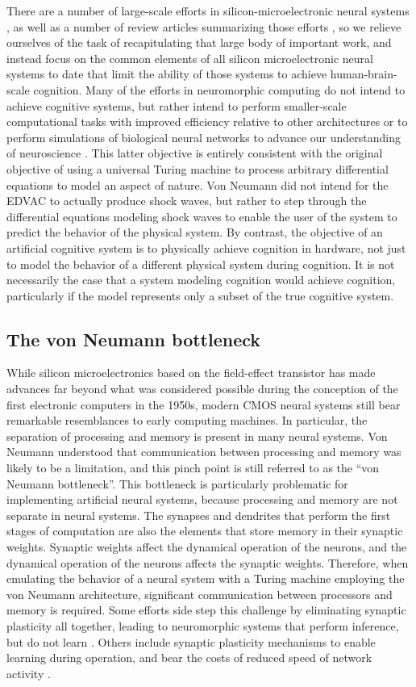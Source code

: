\documentclass[twocolumn]{article}
\begin{document}
There are a number of large-scale efforts in silicon-microelectronic neural systems \cite{}, as well as a number of review articles summarizing those efforts \cite{}, so we relieve ourselves of the task of recapitulating that large body of important work, and instead focus on the common elements of all silicon microelectronic neural systems to date that limit the ability of those systems to achieve human-brain-scale cognition. Many of the efforts in neuromorphic computing do not intend to achieve cognitive systems, but rather intend to perform smaller-scale computational tasks with improved efficiency relative to other architectures \cite{mear2014,dasr2018} or to perform simulations of biological neural networks to advance our understanding of neuroscience \cite{pfgr2013,fuga2014}. This latter objective is entirely consistent with the original objective of using a universal Turing machine to process arbitrary differential equations to model an aspect of nature. Von Neumann did not intend for the EDVAC to actually produce shock waves, but rather to step through the differential equations modeling shock waves to enable the user of the system to predict the behavior of the physical system. By contrast, the objective of an artificial cognitive system is to physically achieve cognition in hardware, not just to model the behavior of a different physical system during cognition. It is not necessarily the case that a system modeling cognition would achieve cognition, particularly if the model represents only a subset of the true cognitive system.

\subsection{The von Neumann bottleneck}
While silicon microelectronics based on the field-effect transistor has made advances far beyond what was considered possible during the conception of the first electronic computers in the 1950s, modern CMOS neural systems still bear remarkable resemblances to early computing machines. In particular, the separation of processing and memory is present in many neural systems. Von Neumann understood that communication between processing and memory was likely to be a limitation, and this pinch point is still referred to as the ``von Neumann bottleneck''. This bottleneck is particularly problematic for implementing artificial neural systems, because processing and memory are not separate in neural systems. The synapses and dendrites that perform the first stages of computation are also the elements that store memory in their synaptic weights. Synaptic weights affect the dynamical operation of the neurons, and the dynamical operation of the neurons affects the synaptic weights. Therefore, when emulating the behavior of a neural system with a Turing machine employing the von Neumann architecture, significant communication between processors and memory is required. Some efforts side step this challenge by eliminating synaptic plasticity all together, leading to neuromorphic systems that perform inference, but do not learn \cite{mear2014}. Others include synaptic plasticity mechanisms to enable learning during operation, and bear the costs of reduced speed of network activity \cite{fuga2014,dasr2018}. 
\end{document}
